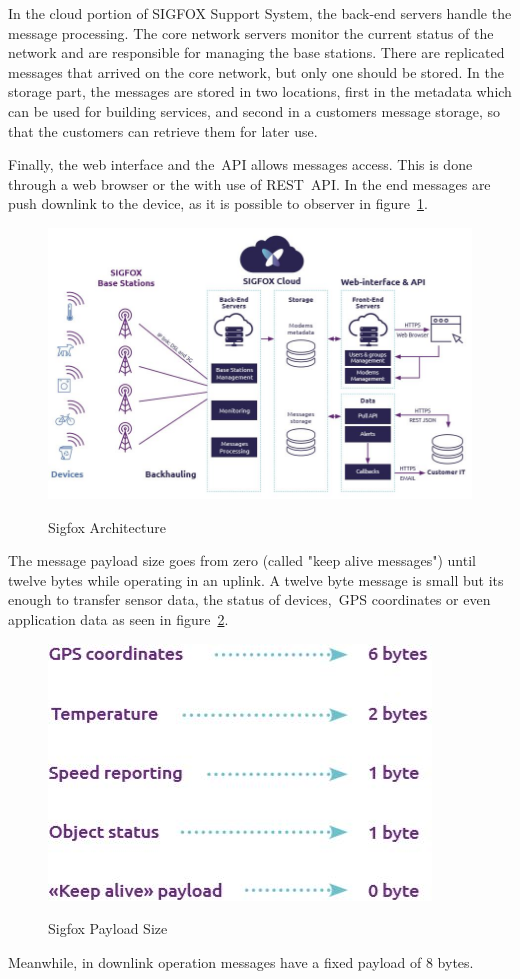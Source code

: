 In the cloud portion of SIGFOX Support System, the back-end servers handle the message processing. The core network servers monitor the current status of the network and are responsible for managing the base stations. There are replicated messages that arrived on the core network, but only one should be stored. In the storage part, the messages are stored in  two locations, first in the metadata which can be used for building services, and second in a customers message storage, so that the customers can retrieve them for later use. 

Finally, the web interface and the~\gls{API} allows messages access. This is done through a web browser or the with use of REST~\gls{API}. In the end messages are  push downlink to the device, as it is possible to observer in figure~\ref{fig:Sigfox_Architecture}.\\

\begin{figure}[htbp]
  \centering
  
    {\includegraphics[height=3 in,width=0.75\linewidth]{Chapters/Figures/SigfoxArchitecture.JPG}}%
 
  \caption{Sigfox Architecture~\cite{SIGTECH}}
  \label{fig:Sigfox_Architecture}
\end{figure}

The message payload size goes from zero (called "keep alive messages") until twelve bytes while operating in an uplink. A twelve byte message is small but its enough to transfer sensor data, the status of devices,~\gls{GPS} coordinates or even application data as seen in figure~\ref{fig:SigFox_Payload_size}.\\
\begin{figure}[htbp]
  \centering
  
    {\includegraphics[width=0.45\linewidth]{Chapters/Figures/SigfoxSize.JPG}}%
 
  \caption{Sigfox Payload Size~\cite{SIGTECH}}
  \label{fig:SigFox_Payload_size}
\end{figure}
Meanwhile, in downlink operation messages have a fixed payload of 8 bytes.

